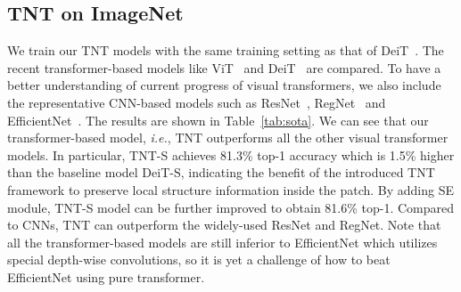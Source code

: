 \documentclass{article}
\begin{document}
\subsection{TNT on ImageNet}
We train our TNT models with the same training setting as that of DeiT~\cite{deit}. The recent transformer-based models like ViT~\cite{vit} and DeiT~\cite{deit} are compared. To have a better understanding of current progress of visual transformers, we also include the representative CNN-based models such as ResNet~\cite{resnet}, RegNet~\cite{regnet} and EfficientNet~\cite{efficientnet}. The results are shown in Table~\ref{tab:sota}. We can see that our transformer-based model, \emph{i.e.}, TNT outperforms all the other visual transformer models. In particular, TNT-S achieves 81.3\% top-1 accuracy which is 1.5\% higher than the baseline model DeiT-S, indicating the benefit of the introduced TNT framework to preserve local structure information inside the patch. By adding SE module, TNT-S model can be further improved to obtain 81.6\% top-1. Compared to CNNs, TNT can outperform the widely-used ResNet and RegNet. Note that all the transformer-based models are still inferior to EfficientNet which utilizes special depth-wise convolutions, so it is yet a challenge of how to beat EfficientNet using pure transformer.
\end{document}
